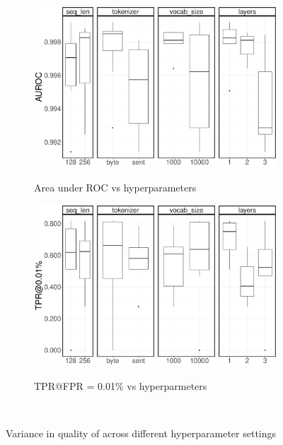 \begin{figure}
\begin{subfigure}{0.8\linewidth}
	\centering
\includegraphics[width=0.95\linewidth,alt={Box plots for area under ROC comparison for different seq len, tokenizers, vocab size, and layers.}]{urltran/figures/roc_hyperparams}
\caption{Area under ROC vs hyperparameters}
\label{fig:urltran:pretrain_scratch:roc}
\end{subfigure}
\begin{subfigure}{0.8\linewidth}
	\centering
\includegraphics[width=0.95\linewidth,alt={Box plots for TPR@FPR=0.01\% comparison across different seq len, tokenizers, vocab size, and layers.}]{urltran/figures/tpr_0.01_hyperparams}
\caption{TPR@FPR = 0.01\% vs hyperparmeters}
\label{fig:urltran:pretrain_scratch:tpr}
\end{subfigure}
\caption{Variance in quality of \URLTranSysc across different hyperparameter settings}\
\label{fig:urltran:pretrain_scratch}
\end{figure}


